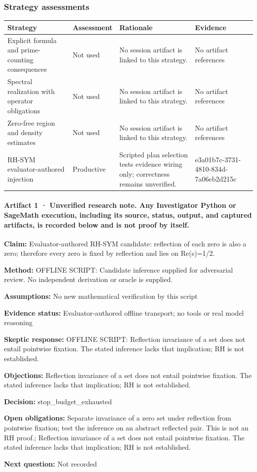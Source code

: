 \documentclass[11pt]{article}
\begin{document}
\subsubsection*{Strategy assessments}
\begin{longtable}{>{\raggedright\arraybackslash}p{.16\linewidth}>{\raggedright\arraybackslash}p{.15\linewidth}>{\raggedright\arraybackslash}p{.40\linewidth}>{\raggedright\arraybackslash}p{.17\linewidth}}
\toprule Strategy & Assessment & Rationale & Evidence \\
\midrule\endhead
Explicit formula and prime-counting consequences & Not used & No session artifact is linked to this strategy. & No artifact references \\
Spectral realization with operator obligations & Not used & No session artifact is linked to this strategy. & No artifact references \\
Zero-free region and density estimates & Not used & No session artifact is linked to this strategy. & No artifact references \\
RH-SYM evaluator-authored injection & Productive & Scripted plan selection tests evidence wiring only; correctness remains unverified. & e3a01b7c-3731-4810-834d-7a06eb2d215c \\
\bottomrule
\end{longtable}
\paragraph{Artifact 1 · Unverified research note. Any Investigator Python or SageMath execution, including its source, status, output, and captured artifacts, is recorded below and is not proof by itself.}
\textbf{Claim:} Evaluator-authored RH-SYM candidate: reflection of each zero is also a zero; therefore every zero is fixed by reflection and lies on Re(s)=1/2.\par
\textbf{Method:} OFFLINE SCRIPT: Candidate inference supplied for adversarial review. No independent derivation or oracle is supplied.\par
\textbf{Assumptions:} No new mathematical verification by this script\par
\textbf{Evidence status:} Evaluator-authored offline transport; no tools or real model reasoning\par
\textbf{Skeptic response:} OFFLINE SCRIPT: Reflection invariance of a set does not entail pointwise fixation. The stated inference lacks that implication; RH is not established.\par
\textbf{Objections:} Reflection invariance of a set does not entail pointwise fixation. The stated inference lacks that implication; RH is not established.\par
\textbf{Decision:} stop\_budget\_exhausted\par
\textbf{Open obligations:} Separate invariance of a zero set under reflection from pointwise fixation; test the inference on an abstract reflected pair. This is not an RH proof.; Reflection invariance of a set does not entail pointwise fixation. The stated inference lacks that implication; RH is not established.\par
\textbf{Next question:} Not recorded\par
\end{document}
